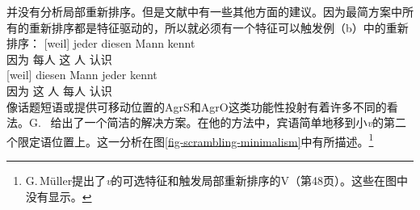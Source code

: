  \citet{Adger2003a} 并没有分析局部重新排序。但是文献中有一些其他方面的建议。因为最简方案中所有的重新排序都是特征驱动的，所以就必须有一个特征可以触发例（b）中的重新排序：
\eal
\ex 
\gll {}[weil] jeder diesen Mann kennt\\
	 {}\spacebr{}因为 每人 这 人 认识\\
\ex 
\gll {}[weil] diesen Mann jeder kennt\\
	 {}\spacebr{}因为 这 人 每人 认识\\
\zl
像话题短语\citep[]{Laenzlinger2004a}或提供可移动位置的AgrS和AgrO\citep[\S~4]{Meinunger2000a}这类功能性投射有着许多不同的看法。G.\  \citet[\S~3.5]{GMueller2014a-u} 给出了一个简洁的解决方案。在他的方法中，宾语简单地移到小\emph{v}的第二个限定语位置上。这一分析在图\vref{fig-scrambling-minimalism}中有所描述。\footnote{%
G.\,Müller提出了\textit{v}的可选特征和触发局部重新排序的V（第48页）。这些在图中没有显示。
} 

